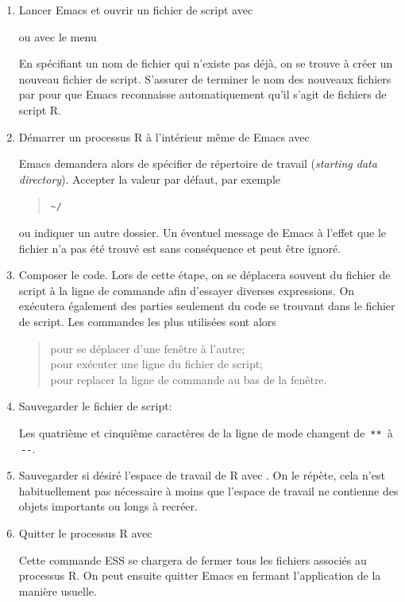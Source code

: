 \begin{enumerate}
\item Lancer Emacs et ouvrir un fichier de script avec
  \begin{quote}
  \end{quote}
  ou avec le menu
  \begin{quote}
  \end{quote}
  En spécifiant un nom de fichier qui n'existe pas déjà, on se trouve
  à créer un nouveau fichier de script. S'assurer de terminer le nom
  des nouveaux fichiers par  pour que Emacs reconnaisse
  automatiquement qu'il s'agit de fichiers de script R.
\item Démarrer un processus R à l'intérieur même de Emacs avec
  \begin{quote}
    \returnkey
  \end{quote}
  Emacs demandera alors de spécifier de répertoire de travail
  (\emph{starting data directory}). Accepter la valeur par défaut, par
  exemple
  \begin{quote}
    \verb=~/ =\returnkey
  \end{quote}
  ou indiquer un autre dossier. Un éventuel message de Emacs à l'effet
  que le fichier  n'a pas été trouvé est sans
  conséquence et peut être ignoré.
\item Composer le code. Lors de cette étape, on se déplacera souvent
  du fichier de script à la ligne de commande afin d'essayer diverses
  expressions. On exécutera également des parties seulement du code se
  trouvant dans le fichier de script. Les commandes les plus utilisées
  sont alors
  \begin{quote}
     pour se déplacer d'une fenêtre à l'autre; \\
     pour exécuter une ligne du fichier de script; \\
     pour replacer la ligne de commande au bas de la
    fenêtre.
  \end{quote}
\item Sauvegarder le fichier de script:
  \begin{quote}
  \end{quote}
  Les quatrième et cinquième caractères de la ligne de mode changent
  de \,\verb|**|\, à \,\verb|--|.
\item Sauvegarder si désiré l'espace de travail de R avec
  . On le répète, cela
  n'est habituellement pas nécessaire à moins que l'espace de travail
  ne contienne des objets importants ou longs à recréer.
\item Quitter le processus R avec
  \begin{quote}
  \end{quote}
  Cette commande ESS se chargera de fermer tous les fichiers associés
  au processus R. On peut ensuite quitter Emacs en fermant
  l'application de la manière usuelle.
\end{enumerate}



